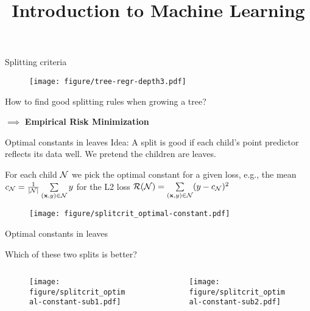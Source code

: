 \documentclass[11pt,compress,t,notes=noshow, xcolor=table]{beamer}
\title{Introduction to Machine Learning}
\institute{\href{https://compstat-lmu.github.io/lecture_i2ml/}{compstat-lmu.github.io/lecture\_i2ml}}
\date{}
\begin{document}
\sloppy


\begin{frame}{Splitting criteria}

 \begin{figure}
    \centering
      \texttt{[image: figure/tree-regr-depth3.pdf]}
    \end{figure}

How to find good splitting rules when growing a tree?
\lz

$\implies$ \textbf{Empirical Risk Minimization}

\end{frame}

\begin{vbframe}{Optimal constants in leaves}
Idea: A split is good if each child's point predictor reflects its data well. We pretend the children are leaves.
\vspace{0.2cm}

For each child $\mathcal{N}$ we pick the optimal constant for a given loss, e.g., the mean $c_{\mathcal{N}} = \frac{1}{|\mathcal{N}|}\sum\limits_{(\mathbf{x}, y) \in \mathcal{N}} y$ for the L2 loss $\mathcal{R}(\mathcal{N}) = \sum\limits_{(\mathbf{x}, y) \in \mathcal{N}} (y - c_{\mathcal{N}})^2$

\begin{figure}
\texttt{[image: figure/splitcrit\_optimal-constant.pdf]} 
\end{figure}



\end{vbframe}



\begin{vbframe}{Optimal constants in leaves}

Which of these two splits is better?

\begin{columns}
\begin{column}{0.5\textwidth}

\color{fgcolor}

\begin{figure}
\texttt{[image: figure/splitcrit\_optimal-constant-sub1.pdf]} 
\end{figure}

 
\end{column}
\begin{column}{0.5\textwidth}

\begin{figure}
\texttt{[image: figure/splitcrit\_optimal-constant-sub2.pdf]} 
\end{figure}

\end{column}
\end{columns}

\end{vbframe}
\end{document}
